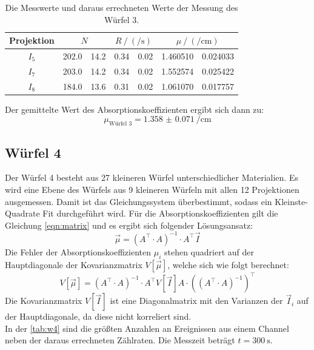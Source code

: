   \begin{table}[H]
    \centering
    \caption{Die Messwerte und daraus errechneten Werte der Messung des Würfel 3.}
    \label{tab:w3}
    \begin{tabular}{c S[table-format=3.1] @{${}\pm{}$} S[table-format=2.1] S[table-format=2.2] @{${}\pm{}$} S[table-format=1.2] S[table-format=1.6] @{${}\pm{}$} S[table-format=1.6]}
      \toprule
      {Projektion} &  &  &  \\
      \midrule
      $I_5$& 202.0 & 14.2 & 0.34 & 0.02 & 1.460510 & 0.024033 \\
      $I_7$& 203.0 & 14.2 & 0.34 & 0.02 & 1.552574 & 0.025422 \\
      $I_8$& 184.0 & 13.6 & 0.31 & 0.02 & 1.061070 & 0.017757 \\
      \bottomrule  
    \end{tabular}
  \end{table}

  \noindent Der gemittelte Wert des Absorptionskoeffizienten ergibt sich dann zu:
  \begin{equation*}
    \mu_{\text{Würfel 3}} = \SI{1.358(71)}{\per\centi\meter}
  \end{equation*}

\subsection{Würfel 4}

  \noindent Der Würfel 4 besteht aus 27 kleineren Würfel unterschiedlicher Materialien. Es wird eine Ebene des Würfels aus 9 kleineren Würfeln mit 
  allen 12 Projektionen ausgemessen. Damit ist das Gleichungssystem überbestimmt, sodass ein Kleinste-Quadrate Fit durchgeführt wird. Für die 
  Absorptionskoeffizienten gilt die Gleichung \eqref{eqn:matrix} und es ergibt sich folgender Lösungsansatz:
  \begin{equation*}
    \vec{\mu} = \left( A^\top \cdot A \right)^{-1} \cdot A^\top \vec{I}
  \end{equation*}
  Die Fehler der Absorptionskoeffizienten $\mu_i$ stehen quadriert auf der Hauptdiagonale der Kovarianzmatrix $V[\vec{\mu}]$, welche sich wie folgt berechnet:
  \begin{equation*}
    V[\vec{\mu}] = \left( A^\top \cdot A \right)^{-1} \cdot A^\top V[\vec{I}] A \cdot \left( \left(A^\top \cdot A\right)^{-1} \right)^\top
  \end{equation*}
  Die Kovarianzmatrix $V[\vec{I}]$ ist eine Diagonalmatrix mit den Varianzen der $\vec{I}_i$ auf der Hauptdiagonale, da diese nicht korreliert sind.\\ 
  In der \autoref{tab:w4} sind die größten Anzahlen an Ereignissen aus einem Channel neben der daraus errechneten Zählraten.
  Die Messzeit beträgt $t =  \SI{300}{\second}$. 

